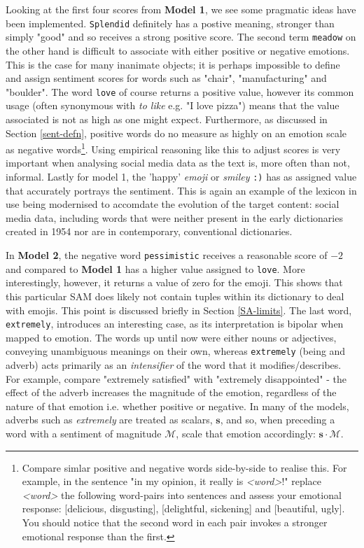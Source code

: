 \documentclass{article}
\begin{document}
\vspace{3mm}

Looking at the first four scores from \textbf{Model 1}, we see some pragmatic ideas have been implemented. \texttt{Splendid} definitely has a postive meaning, stronger than simply "good" and so receives a strong positive score. The second term \texttt{meadow} on the other hand is difficult to associate with either positive or negative emotions. This is the case for many inanimate objects; it is perhaps impossible to define and assign sentiment scores for words such as "chair", "manufacturing" and "boulder". The word \texttt{love} of course returns a positive value, however its common usage (often synonymous with \emph{to like} e.g. "I love pizza") means that the value associated is not as high as one might expect. Furthermore, as discussed in Section \ref{sent-defn}, positive words do no measure as highly on an emotion scale as negative words\footnote{Compare simlar positive and negative words side-by-side to realise this. For example, in the sentence "in my opinion, it really is \emph{<word>}!" replace \emph{<word>} the following word-pairs into sentences and assess your emotional response: [delicious, disgusting], [delightful, sickening] and [beautiful, ugly]. You should notice that the second word in each pair invokes a stronger emotional response than the first.}.
Using empirical reasoning like this to adjust scores is very important when analysing social media data as the text is, more often than not, informal. Lastly for model 1, the 'happy' \emph{emoji} or \emph{smiley} \texttt{:)} has as assigned value that accurately portrays the sentiment. This is again an example of the lexicon in use being modernised to accomdate the evolution of the target content: social media data, including words that were neither present in the early dictionaries created in 1954 nor are in contemporary, conventional dictionaries.

In \textbf{Model 2}, the negative word \texttt{pessimistic} receives a reasonable score of $-2$ and compared to \textbf{Model 1} has a higher value assigned to \texttt{love}. More interestingly, however, it returns a value of zero for the emoji. This shows that this particular SAM does likely not contain tuples within its dictionary to deal with emojis. This point is discussed briefly in Section \ref{SA-limits}. The last word, \texttt{extremely}, introduces an interesting case, as its interpretation is bipolar when mapped to emotion. The words up until now were either nouns or adjectives, conveying unambiguous meanings on their own, whereas \texttt{extremely} (being and adverb) acts primarily as an \emph{intensifier} of the word that it modifies/describes. For example, compare "extremely satisfied" with "extremely disappointed" - the effect of the adverb increases the magnitude of the emotion, regardless of the nature of that emotion i.e. whether positive or negative. In many of the models, adverbs such as \emph{extremely} are treated as scalars, $\mathbf{s}$, and so, when preceding a word with a sentiment of magnitude $\mathcal{M}$, scale that emotion accordingly: $\mathbf{s \cdot \mathcal{M}}$.
\end{document}
